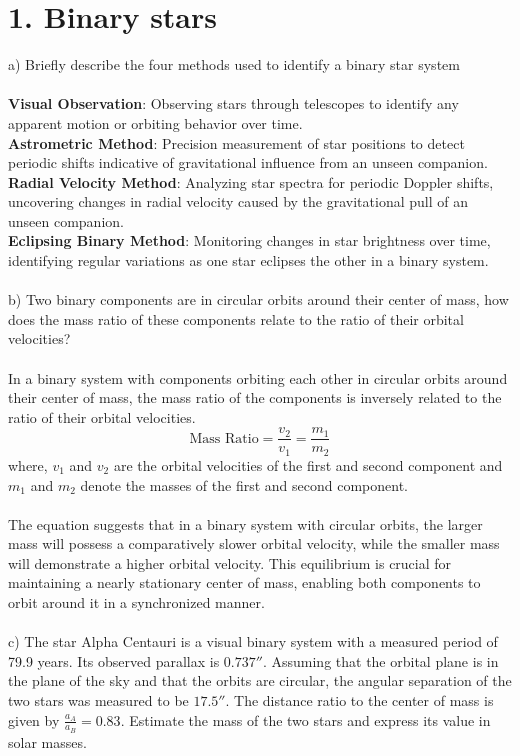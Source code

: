\section*{1. Binary stars} 

a) Briefly describe the four methods used to identify a binary star system\\
\\
\textbf{Visual Observation}: Observing stars through telescopes to identify any apparent motion or 
orbiting behavior over time.\\
\textbf{Astrometric Method}: Precision measurement of star positions to detect periodic shifts indicative 
of gravitational influence from an unseen companion.\\
\textbf{Radial Velocity Method}: Analyzing star spectra for periodic Doppler shifts, uncovering changes 
in radial velocity caused by the gravitational pull of an unseen companion.\\
\textbf{Eclipsing Binary Method}: Monitoring changes in star brightness over time, identifying regular 
variations as one star eclipses the other in a binary system.\\
\\
b) Two binary components are in circular orbits around their center of mass, how does the mass ratio of 
these components relate to the ratio of their orbital velocities?\\
\\
In a binary system with components orbiting each other in circular orbits around their center of mass, 
the mass ratio of the components is inversely related to the ratio of their orbital velocities.
\begin{equation*}
  \text{Mass Ratio} = \frac{v_2}{v_1} = \frac{m_1}{m_2}
\end{equation*}
where, $v_1$ and $v_2$ are the orbital velocities of the first and second component and $m_1$ and $m_2$ 
denote the masses of the first and second component.\\
\\
The equation suggests that in a binary system with circular orbits, the larger mass will possess a 
comparatively slower orbital velocity, while the smaller mass will demonstrate a higher orbital velocity. 
This equilibrium is crucial for maintaining a nearly stationary center of mass, enabling both components 
to orbit around it in a synchronized manner.\\
\\
c) The star Alpha Centauri is a visual binary system with a measured period of 79.9 years. Its observed 
parallax is $0.737''$. Assuming that the orbital plane is in the plane of the sky and that the orbits are 
circular, the angular separation of the two stars was measured to be $17.5''$. The distance ratio to the 
center of mass is given by $\frac{a_A}{a_B} = 0.83$. Estimate the mass of the two stars and express its 
value in solar masses.\\
\\
